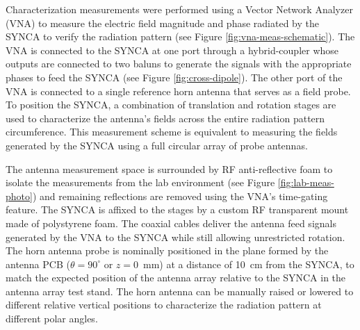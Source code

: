 Characterization measurements were performed using a Vector Network Analyzer (VNA) to measure the electric field magnitude and phase radiated by the SYNCA to verify the radiation pattern (see Figure \ref{fig:vna-meas-schematic}). The VNA is connected to the SYNCA at one port through a hybrid-coupler whose outputs are connected to two baluns to generate the signals with the appropriate phases to feed the SYNCA (see Figure \ref{fig:cross-dipole}). The other port of the VNA is connected to a single reference horn antenna that serves as a field probe. To position the SYNCA, a combination of translation and rotation stages are used to characterize the antenna's fields across the entire radiation pattern circumference. This measurement scheme is equivalent to measuring the fields generated by the SYNCA using a full circular array of probe antennas.

The antenna measurement space is surrounded by RF anti-reflective foam to isolate the measurements from the lab environment (see Figure \ref{fig:lab-meas-photo}) and remaining reflections are removed using the VNA's time-gating feature. The SYNCA is affixed to the stages by a custom RF transparent mount made of polystyrene foam. The coaxial cables deliver the antenna feed signals generated by the VNA to the SYNCA while still allowing unrestricted rotation. The horn antenna probe is nominally positioned in the plane formed by the antenna PCB ($\theta=90^\circ$ or $z=0$~mm) at a distance of 10~cm from the SYNCA, to match the expected position of the antenna array relative to the SYNCA in the antenna array test stand. The horn antenna can be manually raised or lowered to different relative vertical positions to characterize the radiation pattern at different polar angles.

